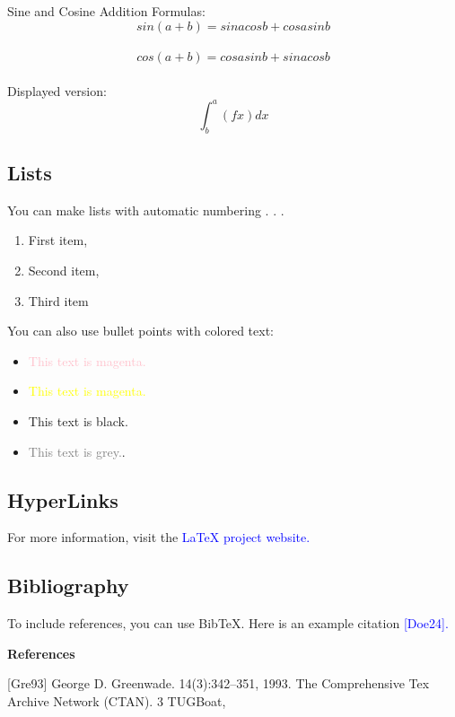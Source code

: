 \documentclass{article}
\begin{document}
	Sine and Cosine Addition Formulas:  $$ sin(a+b) = sinacosb+ cosasinb $$\\
	$$ cos(a+b) = cosasinb+ sinacosb $$\\
	Displayed version:    $$\int^a_b(fx)dx $$
	
	
	
	
	
	
	\subsection{Lists}
	You can make lists with automatic numbering . . .
	\begin{enumerate}
		\item First item,
		\item Second item,
		\item Third item
	\end{enumerate}
	You can also use bullet points with colored text:
	\begin{itemize}
		\item \textcolor{pink}{This text is magenta.}
		\item  \textcolor{yellow}{This text is magenta.}
		\item  This text is black.
		\item  \textcolor{gray}{This text is grey.}.
	\end{itemize}
	\subsection{HyperLinks}
	For more information, visit the \textcolor{blue}{LaTeX project website.}
	
	\subsection{Bibliography}
	To include references, you can use BibTeX. Here is an example citation \textcolor{blue}{[Doe24].}
	
	
	
	
	\vspace{3mm}
	
	\huge \textbf{References}
	\vspace{4mm}
	
	
	\small[Gre93] George D. Greenwade.
	14(3):342–351, 1993.
	The Comprehensive Tex Archive Network (CTAN).
	3
	TUGBoat,
	
	
\end{document}
